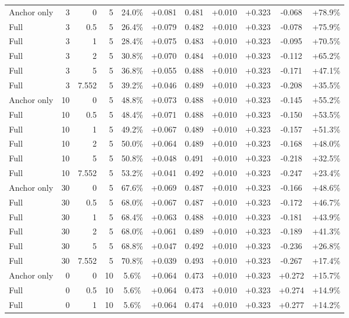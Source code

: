 \begin{table}[htbp]
\begin{tabular}{lrrrccccccc}
Anchor only & 3 & 0 & 5 & 24.0\% & +0.081 & 0.481 & +0.010 & +0.323 & -0.068 & +78.9\% \\
Full & 3 & 0.5 & 5 & 26.4\% & +0.079 & 0.482 & +0.010 & +0.323 & -0.078 & +75.9\% \\
Full & 3 & 1 & 5 & 28.4\% & +0.075 & 0.483 & +0.010 & +0.323 & -0.095 & +70.5\% \\
Full & 3 & 2 & 5 & 30.8\% & +0.070 & 0.484 & +0.010 & +0.323 & -0.112 & +65.2\% \\
Full & 3 & 5 & 5 & 36.8\% & +0.055 & 0.488 & +0.010 & +0.323 & -0.171 & +47.1\% \\
Full & 3 & 7.552 & 5 & 39.2\% & +0.046 & 0.489 & +0.010 & +0.323 & -0.208 & +35.5\% \\
Anchor only & 10 & 0 & 5 & 48.8\% & +0.073 & 0.488 & +0.010 & +0.323 & -0.145 & +55.2\% \\
Full & 10 & 0.5 & 5 & 48.4\% & +0.071 & 0.488 & +0.010 & +0.323 & -0.150 & +53.5\% \\
Full & 10 & 1 & 5 & 49.2\% & +0.067 & 0.489 & +0.010 & +0.323 & -0.157 & +51.3\% \\
Full & 10 & 2 & 5 & 50.0\% & +0.064 & 0.489 & +0.010 & +0.323 & -0.168 & +48.0\% \\
Full & 10 & 5 & 5 & 50.8\% & +0.048 & 0.491 & +0.010 & +0.323 & -0.218 & +32.5\% \\
Full & 10 & 7.552 & 5 & 53.2\% & +0.041 & 0.492 & +0.010 & +0.323 & -0.247 & +23.4\% \\
Anchor only & 30 & 0 & 5 & 67.6\% & +0.069 & 0.487 & +0.010 & +0.323 & -0.166 & +48.6\% \\
Full & 30 & 0.5 & 5 & 68.0\% & +0.067 & 0.487 & +0.010 & +0.323 & -0.172 & +46.7\% \\
Full & 30 & 1 & 5 & 68.4\% & +0.063 & 0.488 & +0.010 & +0.323 & -0.181 & +43.9\% \\
Full & 30 & 2 & 5 & 68.0\% & +0.061 & 0.489 & +0.010 & +0.323 & -0.189 & +41.3\% \\
Full & 30 & 5 & 5 & 68.8\% & +0.047 & 0.492 & +0.010 & +0.323 & -0.236 & +26.8\% \\
Full & 30 & 7.552 & 5 & 70.8\% & +0.039 & 0.493 & +0.010 & +0.323 & -0.267 & +17.4\% \\
Anchor only & 0 & 0 & 10 & 5.6\% & +0.064 & 0.473 & +0.010 & +0.323 & +0.272 & +15.7\% \\
Full & 0 & 0.5 & 10 & 5.6\% & +0.064 & 0.473 & +0.010 & +0.323 & +0.274 & +14.9\% \\
Full & 0 & 1 & 10 & 5.6\% & +0.064 & 0.474 & +0.010 & +0.323 & +0.277 & +14.2\% \\

\end{tabular}
\end{table}
